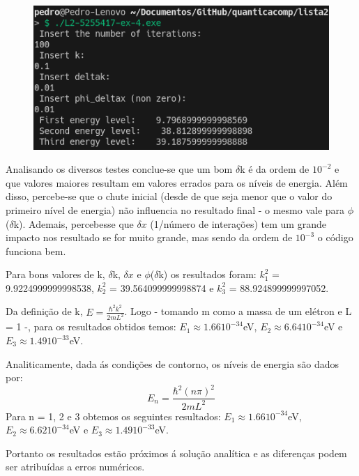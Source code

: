 \documentclass[12pt, a4paper]{article} %
\begin{document}
        \begin{figure}[H]    
            \centering
            \includegraphics[scale=0.5]{../images/results-ex4-7.png}
            \caption{}
        \end{figure}


    Analisando os diversos testes conclue-se que um bom $\delta$k \'e da ordem de $10^{-2}$ e que valores maiores resultam em valores errados para os n\'iveis de energia. Al\'em disso, percebe-se que o chute inicial (desde de que seja menor que o valor do primeiro n\'ivel de energia) n\~ao influencia no resultado final - o mesmo vale para $\phi$($\delta$k). Ademais, percebesse que $\delta x$ (1/n\'umero de intera\c{c}\~oes) tem um grande impacto nos resultado se for muito grande, mas sendo da ordem de $10^{-3}$ o c\'odigo funciona bem.
    
    Para bons valores de k, $\delta$k, $\delta x$ e $\phi$($\delta$k) os resultados foram: $k^{2}_{1}$ = 9.9224999999998538, $k^{2}_{2}$ = 39.564099999998874 e $k^{2}_{3}$ = 88.924899999997052.
    
    Da defini\c{c}\~ao de k, $E = \frac{\hbar^2k^2}{2mL^2}$. Logo - tomando m como a massa de um el\'etron e L = 1 -, para os resultados obtidos temos: $E_{1} \approx 1.66 10^{-34}$eV, $E_{2} \approx 6.64 10^{-34}$eV e $E_{3} \approx 1.49 10^{-33}$eV.
    
    Analiticamente, dada \'{a}s condi\c{c}\~oes de contorno, os n\'iveis de energia s\~ao dados por:
    \begin{equation}
        E_{n} = \frac{\hbar^2(n \pi)^2}{2mL^2}
    \end{equation}
    Para n = 1, 2 e 3 obtemos os seguintes resultados: $E_{1} \approx 1.66 10^{-34}$eV, $E_{2} \approx 6.62 10^{-34}$eV e $E_{3} \approx 1.49 10^{-33}$eV.

    Portanto os resultados est\~ao pr\'oximos \'{a} solu\c{c}\~ao anal\'itica e as diferen\c{c}as podem ser atribu\'idas a erros num\'ericos.
\end{document}
